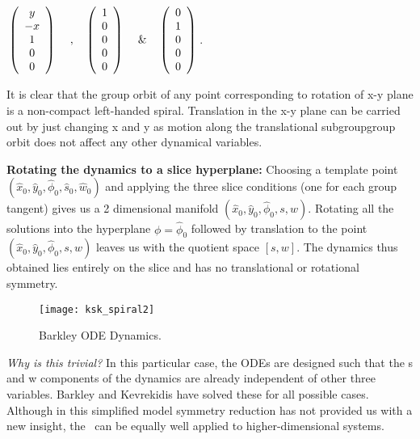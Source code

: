 \begin{description}
$\newline
\left(\begin{array}{c}
y \\-x \\1\\0\\0 \end{array} \right)\, \quad, \quad
\left(\begin{array}{c}
1 \\0 \\0\\0\\0\end{array} \right)\,  \quad \&  \quad
\left(\begin{array}{c}
0 \\1 \\0\\0\\0 \end{array} \right)\,$.

It is clear that the group orbit of any point corresponding to rotation of x-y plane is a
non-compact left-handed spiral. Translation in the x-y plane can be carried out by just
changing x and y as motion along the translational subgroupgroup orbit does not affect any
other dynamical variables.


\textbf{Rotating the dynamics to a slice hyperplane:} Choosing a template point $(\hat{x}_0,\hat{y}_0,\hat{\phi}_0
,\hat{s}_0,\hat{w}_0)$ and applying the three slice conditions (one for each
group tangent) gives us a 2 dimensional manifold $(\hat{x}_0,\hat{y}_0,\hat{\phi}_0
,s,w)$. Rotating all the solutions into the hyperplane $\phi=\hat{\phi}_0$ followed by
translation to the point $(\hat{x}_0,\hat{y}_0,\hat{\phi}_0,s,w)$ leaves us with the quotient space
$[s,w]$. The dynamics thus obtained lies entirely on the slice and has no translational or rotational symmetry.
\begin{figure}[h!tb]
\begin{center}
\texttt{[image: ksk\_spiral2]}
\end{center}
\caption{ Barkley ODE Dynamics.}
\label{fig:ksk_spiral2}
\end{figure}

\emph{Why is this trivial?} In this particular case, the ODEs are
designed such that the s and w components of the dynamics are already
independent of other three variables. Barkley and Kevrekidis
 have solved these for all possible cases. Although in
this simplified model symmetry reduction has not provided us with a
new insight, the \mslices\ can be equally well applied to higher-dimensional
systems.


\end{description}
